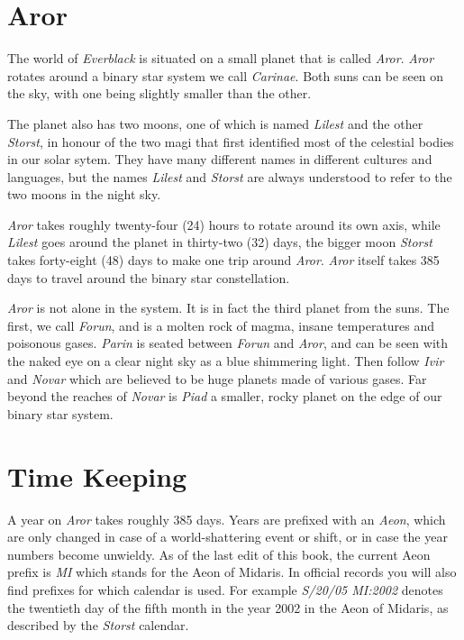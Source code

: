 \twocolumn
\section{Aror}

The world of \emph{Everblack} is situated on a small planet that is
called \emph{Aror}. \emph{Aror} rotates around a binary star system we
call \emph{Carinae}. Both suns can be seen on the sky, with one being
slightly smaller than the other.

The planet also has two moons, one of which is named \emph{Lilest} and
the other \emph{Storst}, in honour of the two magi that first
identified most of the celestial bodies in our solar sytem. They have
many different names in different cultures and languages, but the
names \emph{Lilest} and \emph{Storst} are always understood to refer
to the two moons in the night sky.

\emph{Aror} takes roughly twenty-four (24) hours to rotate around its
own axis, while \emph{Lilest} goes around the planet in thirty-two
(32) days, the bigger moon \emph{Storst} takes forty-eight (48) days
to make one trip around \emph{Aror}. \emph{Aror} itself takes 385 days
to travel around the binary star constellation.

\emph{Aror} is not alone in the system. It is in fact the third planet
from the suns. The first, we call \emph{Forun}, and is a molten rock
of magma, insane temperatures and poisonous gases. \emph{Parin} is
seated between \emph{Forun} and \emph{Aror}, and can be seen with the
naked eye on a clear night sky as a blue shimmering light. Then follow
\emph{Ivir} and \emph{Novar} which are believed to be huge planets made
of various gases. Far beyond the reaches of \emph{Novar} is
\emph{Piad} a smaller, rocky planet on the edge of our binary star
system.

\section{Time Keeping}

A year on \emph{Aror} takes roughly 385 days. Years are prefixed with an
\emph{Aeon}, which are only changed in case of a world-shattering event
or shift, or in case the year numbers become unwieldy. As of the last
edit of this book, the current Aeon prefix is \emph{MI} which stands for
the Aeon of Midaris. In official records you will also find prefixes for
which calendar is used. For example \emph{S/20/05 MI:2002} denotes the
twentieth day of the fifth month in the year 2002 in the Aeon of
Midaris, as described by the \emph{Storst} calendar.

